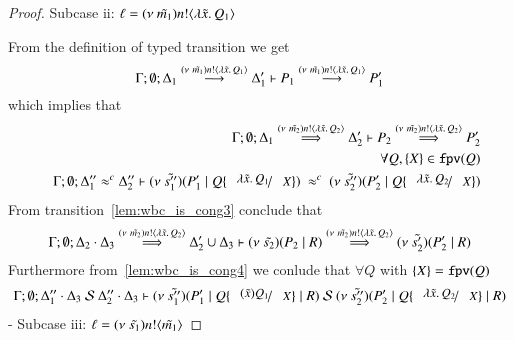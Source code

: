 \begin{proof}
	\noi Subcase ii: $\ell = (\nu\ \tilde{m_1}) n ! \langle \lambda \tilde{x}.\,Q_1 \rangle$

	\noi From the definition of typed transition we get
	\[
		\Gamma; \emptyset; \Delta_1 \stackrel{(\nu\ \tilde{m_1}) n ! \langle \lambda \tilde{x}.\,Q_1 \rangle}{\longrightarrow} \Delta_1' \vdash P_1 \stackrel{(\nu\ \tilde{m_1}) n ! \langle \lambda \tilde{x}.\,Q_1 \rangle}{\longrightarrow} P_1'
	\]
	\noi which implies that
%
	\begin{eqnarray}
		&&\Gamma; \emptyset; \Delta_1 \By{\news{\tilde{m_2}} \bactout{n}{\abs{\tilde{x}}{Q_2}}} \Delta_2' \proves P_2 \By{\news{\tilde{m_2}} \bactout{n}{\abs{\tilde{x}}{Q_2}}} P_2' \label{lem:wbc_is_cong3} \\
		&&\forall Q, \set{X} \in \fpv{Q} \nonumber \\
		&&\Gamma; \emptyset; \Delta_1'' \wbc \Delta_2'' \proves \newsp{\tilde{s_1''}}{P_1' \Par Q \subst{\abs{\tilde{x}}{Q_1}}{X}}\ \wbc\ \newsp{\tilde{s_2''}}{P_2' \Par Q \subst{\abs{\tilde{x}}{Q_2}}{X}} \label{lem:wbc_is_cong4}
	\end{eqnarray}
%
	\noi From transition~\ref{lem:wbc_is_cong3} conclude that 
	\[
		\Gamma;\emptyset; \Delta_2 \cdot \Delta_3 \stackrel{(\nu\ \tilde{m_2}) n ! \langle \lambda \tilde{x}.\,Q_2 \rangle}{\Longrightarrow} \Delta_2' \cup \Delta_3 \vdash (\nu\ \tilde{s_2})(P_2 \;|\; R) \stackrel{(\nu\ \tilde{m_2}) n ! \langle \lambda \tilde{x}.\,Q_2 \rangle}{\Longrightarrow} (\nu\ \tilde{s_2'})(P_2' \;|\; R)
	\]
%
	\noi Furthermore from~\ref{lem:wbc_is_cong4} we conlude that $\forall Q$ with $\{X\} = \mathtt{fpv}(Q)$
%
	\[
		\Gamma; \emptyset; \Delta_1'' \cat \Delta_3\ \mathcal{S}\ \Delta_2'' \cat \Delta_3 \proves \newsp{\tilde{s_1''}}{P_1' \Par Q \subst{(\tilde{x}) Q_1}{X} \Par R}\ \mathcal{S}\ \newsp{\tilde{s_2''}}{P_2' \Par Q \subst{\abs{\tilde{x}}{Q_2}}{X} \Par R}
	\]
%
	- Subcase iii: $\ell = (\nu\ \tilde{s_1}) n ! \langle \tilde{m_1} \rangle$


\end{proof}
